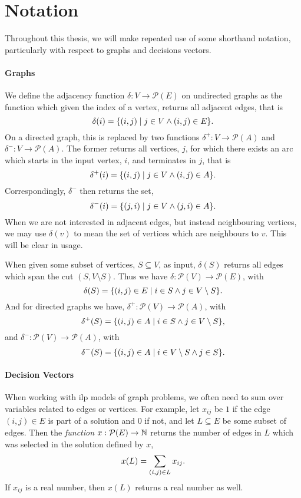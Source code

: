 \section{Notation}\label{sec:intro:notation}

Throughout this thesis, we will make repeated use of some shorthand notation, particularly
with respect to graphs and decisions vectors.

\paragraph{Graphs}

We define the adjacency function $\delta : V \to \mathcal{P} (E)$ on undirected graphs as
the function which given the index of a vertex, returns all adjacent edges, that is
$$\delta(i) = \{(i,j) \mid j \in V \wedge (i, j) \in E\}\mathnormal{.}$$
On a directed graph, this is replaced by two functions
$\delta^+ : V \to \mathcal{P} (A)$
and $\delta^-: V \to \mathcal{P} (A)$.
The former returns all vertices, $j$, for which there exists an arc
which starts in the input vertex, $i$, and terminates in $j$, that is
$$\delta^+(i) = \{(i, j) \mid j \in V \wedge (i, j) \in A\}\mathnormal{.}$$
Correspondingly, $\delta^-$ then returns the set,
$$\delta^-(i) = \{(j, i) \mid j \in V \wedge (j, i) \in A\}\mathnormal{.}$$
When we are not interested in adjacent edges, but instead neighbouring vertices,
we may use $\delta(v)$ to mean the set of vertices which are neighbours to $v$.
This will be clear in usage.


When given some subset of vertices, $S \subseteq V$, as input,
$\delta(S)$ returns all edges which span the cut $(S, V \setminus S)$.
Thus we have $\delta : \mathcal{P}(V) \to \mathcal{P}(E)$, with
$$\delta(S) = \{(i,j) \in E \mid i \in S \wedge j \in V \setminus S\}\mathnormal{.}$$
And for directed graphs we have, $\delta^+ : \mathcal{P}(V) \to \mathcal{P}(A)$, with
$$\delta^+(S) = \{(i,j) \in A \mid i \in S \wedge j \in V \setminus S\}\mathnormal{,}$$
and $\delta^- : \mathcal{P}(V) \to \mathcal{P}(A)$, with
$$\delta^-(S) = \{(i,j) \in A \mid i \in V \setminus S \wedge j \in S\}\mathnormal{.}$$

\paragraph{Decision Vectors}

When working with \gls{ilp} models of graph problems, we often need to sum over variables
related to edges or vertices. For example, let $x_{ij}$ be $1$ if the edge $(i,j) \in E$
is part of a solution and $0$ if not, and let $L \subseteq E$ be some subset of edges.
Then the \textit{function} $x : \mathcal{P} (E) \to \mathbb{N}$ returns the number of edges
 in $L$ which was selected in the solution defined by $x$,
 $$x(L) = \sum_{(i, j) \in L} x_{ij}\mathnormal{.}$$
 If $x_{ij}$ is a real number, then $x(L)$ returns a real number as well.

\clearpage
\glsaddall
\printglossaries

